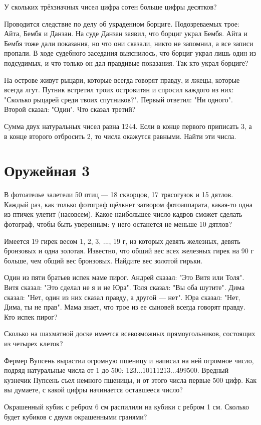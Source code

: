 У скольких трёхзначных чисел цифра сотен больше цифры десятков?

 Проводится следствие по делу об украденном борциге. Подозреваемых трое: Айта, Бембя и Данзан. На суде Данзан заявил, что борциг украл Бембя. Айта и Бембя тоже дали показания, но что они сказали, никто не запомнил, а все записи пропали. В ходе судебного заседания выяснилось, что борциг украл лишь один из подсудимых, и что только он дал правдивые показания. Так кто украл борциге?
 
 На острове живут рыцари, которые всегда говорят правду, и лжецы, которые всегда лгут. Путник встретил троих островитян и спросил каждого из них: "Сколько рыцарей среди твоих спутников?". Первый ответил: "Ни одного". Второй сказал: "Один". Что сказал третий?

 Сумма двух натуральных чисел равна 1244. Если в конце первого приписать 3, а в конце второго отбросить 2, то числа окажутся равными. Найти эти числа.  

\newpage
\section{Оружейная 3}


В фотоателье залетели 50 птиц — 18 скворцов, 17 трясогузок и 15 дятлов. Каждый раз, как только фотограф щёлкнет затвором фотоаппарата, какая-то одна из птичек улетит (насовсем). Какое наибольшее число кадров сможет сделать фотограф, чтобы быть уверенным: у него останется не меньше 10 дятлов?

 Имеется 19 гирек весом 1, 2, 3, ..., 19 г, из которых девять железных, девять бронзовых и одна золотая. Известно, что общий вес всех железных гирек на 90 г больше, чем общий вес бронзовых. Найдите вес золотой гирьки.

 Один из пяти братьев испек маме пирог. Андрей сказал: "Это Витя или Толя". Витя сказал: "Это сделал не я и не Юра". Толя сказал: "Вы оба шутите". Дима сказал: "Нет, один из них сказал правду, а другой — нет". Юра сказал: "Нет, Дима, ты не прав". Мама знает, что трое из ее сыновей всегда говорят правду. Кто испек пирог?

Сколько на шахматной доске имеется всевозможных прямоугольников, состоящих из четырех клеток?

Фермер Вупсень вырастил огромную пшеницу и написал на ней огромное число, подряд натуральные числа от 1 до 500: 123...10111213...499500. Вредный кузнечик Пупсень съел немного пшеницы, и  от этого числа первые 500 цифр. Как вы думаете, с какой цифры начинается оставшееся число?

 Окрашенный кубик с ребром 6 см распилили на кубики с ребром 1 см. Сколько будет кубиков с двумя окрашенными гранями?

